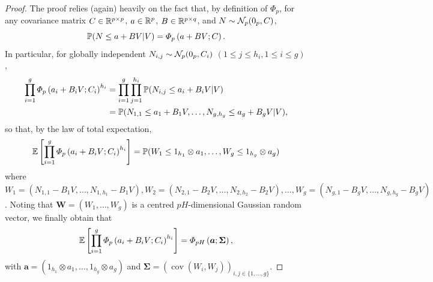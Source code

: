 \documentclass[aoas]{imsart}
\begin{document}
\begin{proof}
	The proof relies (again) heavily on the fact that, by definition of $\Phi_{p}$, for any covariance matrix $C \in \mathbb{R}^{p \times p}$, $a\in \mathbb{R}^p$, $B\in \mathbb{R}^{p \times q}$, and $N\sim \mathcal{N}_{p}(0_{p},C)$, 
	$$
	\mathbb{P}(N\leq a + BV | V)
	=
	\varPhi_{p}\left( a + BV; C \right).
	$$
	In particular, for globally independent $N_{i,j} \sim \mathcal{N}_{p}(0_{p},C_i)$ $(1\leq j \leq h_i, 1\leq i \leq g)$, 
	\begin{equation*}
	\begin{split}
	\prod_{i=1}^{g} \varPhi_{p}\left(a_i + B_{i}V; \covN_{i} \right)^{h_i}
	&=
	\prod_{i=1}^{g}
	\prod_{j=1}^{h_{i}}
	\mathbb{P}(N_{i,j}\leq a_i + B_i V | V)\\
	&=\mathbb{P}(N_{1,1}\leq a_1 + B_1 V, \dots, N_{g,h_{g}}\leq a_g + B_g V | V),
	\end{split} 
	\end{equation*}
	so that, by the law of total expectation, 
	\begin{equation*}
	\begin{split}
	\mathbb{E}\left[ \prod_{i=1}^{g} \varPhi_{p}\left(a_i + B_{i}V; \covN_{i} \right)^{h_i} \right]
	=
	\mathbb{P}(W_{1} \leq 1_{h_{1}} \otimes a_1, \dots, W_{g} \leq 1_{h_{g}} \otimes a_g)
	\end{split}
	\end{equation*}
	where 
	$W_{1}=(N_{1,1}- B_1 V, \dots, N_{1,h_{1}}- B_1 V), 
	W_{2}=(N_{2,1}- B_2 V, \dots, N_{2,h_{2}}- B_2 V), 
	\dots, W_{g}=(N_{g,1}- B_g V, \dots, N_{g,h_{g}}- B_g V)$. Noting that $\mathbf{W}=(W_1,\dots, W_g)$ is a centred $p H$-dimensional Gaussian random vector, we finally obtain that 
	\begin{equation*}
	\begin{split}
	\mathbb{E}\left[ \prod_{i=1}^{g} \varPhi_{p}\left(a_i + B_{i}V; \covN_{i} \right)^{h_i} \right]
	=
	\varPhi_{p H}\left(\bm{a};\mathbf{\Sigma}\right),
	\end{split}
	\end{equation*}
	with $\bm{a}=(1_{h_{1}} \otimes a_1, \dots, 1_{h_{g}} \otimes a_g)$ and $\bm{\Sigma}=(\operatorname{cov}(W_i,W_j))_{i,j \in \{1,\dots, g\}}$.
\end{proof}


\end{document}
